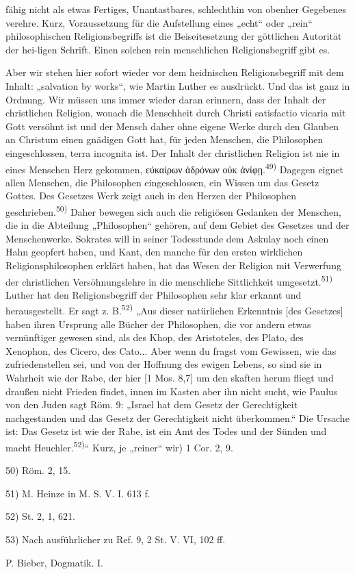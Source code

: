 \noindent{}\par\vspace{1em}\noindent fähig nicht als etwas Fertiges, Unantastbares, schlechthin von obenher Gegebenes verehre. Kurz, Voraussetzung für die Aufstellung eines „echt“ oder „rein“ philosophischen Religionsbegriffs ist die Beiseitesetzung der göttlichen Autorität der hei-ligen Schrift. Einen solchen rein menschlichen Religionsbegriff gibt es.\par Aber wir stehen hier sofort wieder vor dem heidnischen Religionsbegriff mit dem Inhalt: „salvation by works“, wie Martin Luther es ausdrückt. Und das ist ganz in Ordnung. Wir müssen uns immer wieder daran erinnern, dass der Inhalt der christlichen Religion, wonach die Menschheit durch Christi satisfactio vicaria mit Gott versöhnt ist und der Mensch daher ohne eigene Werke durch den Glauben an Christum einen gnädigen Gott hat, für jeden Menschen, die Philosophen eingeschlossen, terra incognita ist. Der Inhalt der christlichen Religion ist nie in eines Menschen Herz gekommen, εὐκαίρων ἀδρόνων οὐκ ἀνίφῃ.\textsuperscript{49)} Dagegen eignet allen Menschen, die Philosophen eingeschlossen, ein Wissen um das Gesetz Gottes. Des Gesetzes Werk zeigt auch in den Herzen der Philosophen geschrieben.\textsuperscript{50)} Daher bewegen sich auch die religiösen Gedanken der Menschen, die in die Abteilung „Philosophen“ gehören, auf dem Gebiet des Gesetzes und der Menschenwerke. Sokrates will in seiner Todesstunde dem Askulay noch einen Hahn geopfert haben, und Kant, den manche für den ersten wirklichen Religionsphilosophen erklärt haben, hat das Wesen der Religion mit Verwerfung der christlichen Versöhnungslehre in die menschliche Sittlichkeit umgesetzt.\textsuperscript{51)} Luther hat den Religionsbegriff der Philosophen sehr klar erkannt und herausgestellt. Er sagt z. B.\textsuperscript{52)} „Aus dieser natürlichen Erkenntnis [des Gesetzes] haben ihren Ursprung alle Bücher der Philosophen, die vor andern etwas vernünftiger gewesen sind, als des Khop, des Aristoteles, des Plato, des Xenophon, des Cicero, des Cato... Aber wenn du fragst vom Gewissen, wie das zufriedenstellen sei, und von der Hoffnung des ewigen Lebens, so sind sie in Wahrheit wie der Rabe, der hier [1 Mos. 8,7] um den skaften herum fliegt und draußen nicht Frieden findet, innen im Kasten aber ihn nicht sucht, wie Paulus von den Juden sagt Röm. 9: „Israel hat dem Gesetz der Gerechtigkeit nachgestanden und das Gesetz der Gerechtigkeit nicht überkommen.“ Die Ursache ist: Das Gesetz ist wie der Rabe, ist ein Amt des Todes und der Sünden und macht Heuchler.\textsuperscript{52)}“ Kurz, je „reiner“ wir\vfill\small{}) 1 Cor. 2, 9.\par 50) Röm. 2, 15.\par 51) M. Heinze in M. S. V. I. 613 f.\par 52) St. 2, 1, 621.\par 53) Nach ausführlicher zu Ref. 9, 2 St. V. VI, 102 ff.\par P. Bieber, Dogmatik. I.
